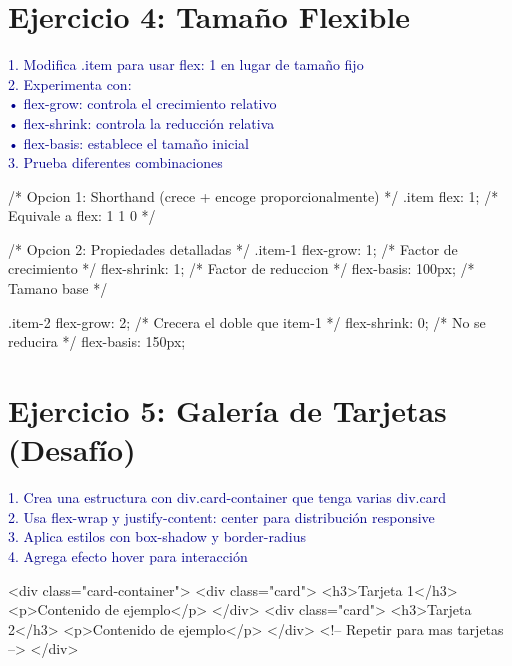 \documentclass[12pt, a4paper]{article}
\newcommand{\enunciado}[1]{
    \vspace{0.5em}
    \noindent\colorbox{blue!10}{
        \parbox{\dimexpr\textwidth-2\fboxsep}{
            \small\sffamily\textcolor{darkblue}{#1}
        }
    }
    \vspace{0.5em}
}
\begin{document}
\section*{Ejercicio 4: Tamaño Flexible}
\enunciado{
    1. Modifica .item para usar flex: 1 en lugar de tamaño fijo \\
    2. Experimenta con: \\
    \hspace{1em}• flex-grow: controla el crecimiento relativo \\
    \hspace{1em}• flex-shrink: controla la reducción relativa \\
    \hspace{1em}• flex-basis: establece el tamaño inicial \\
    3. Prueba diferentes combinaciones
}

\begin{codebox}[title=CSS]
/* Opcion 1: Shorthand (crece + encoge proporcionalmente) */
.item {
    flex: 1;  /* Equivale a flex: 1 1 0 */
}

/* Opcion 2: Propiedades detalladas */
.item-1 {
    flex-grow: 1;    /* Factor de crecimiento */
    flex-shrink: 1;  /* Factor de reduccion */
    flex-basis: 100px; /* Tamano base */
}

.item-2 {
    flex-grow: 2;    /* Crecera el doble que item-1 */
    flex-shrink: 0;  /* No se reducira */
    flex-basis: 150px;
}
\end{codebox}

\section*{Ejercicio 5: Galería de Tarjetas (Desafío)}
\enunciado{
    1. Crea una estructura con div.card-container que tenga varias div.card \\
    2. Usa flex-wrap y justify-content: center para distribución responsive \\
    3. Aplica estilos con box-shadow y border-radius \\
    4. Agrega efecto hover para interacción
}

\begin{codebox}[title=HTML]
<div class="card-container">
    <div class="card">
        <h3>Tarjeta 1</h3>
        <p>Contenido de ejemplo</p>
    </div>
    <div class="card">
        <h3>Tarjeta 2</h3>
        <p>Contenido de ejemplo</p>
    </div>
    <!-- Repetir para mas tarjetas -->
</div>
\end{codebox}
\end{document}
